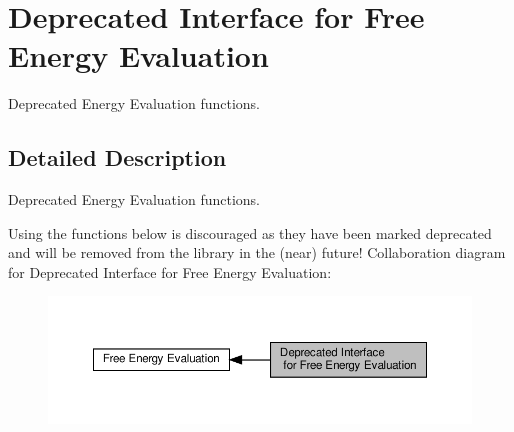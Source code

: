 \hypertarget{group__eval__deprecated}{}\section{Deprecated Interface for Free Energy Evaluation}
\label{group__eval__deprecated}


Deprecated Energy Evaluation functions.  




\subsection{Detailed Description}
Deprecated Energy Evaluation functions. 

Using the functions below is discouraged as they have been marked deprecated and will be removed from the library in the (near) future! Collaboration diagram for Deprecated Interface for Free Energy Evaluation\+:
\nopagebreak
\begin{figure}[H]
\begin{center}
\leavevmode
\includegraphics[width=350pt]{group__eval__deprecated}
\end{center}
\end{figure}
